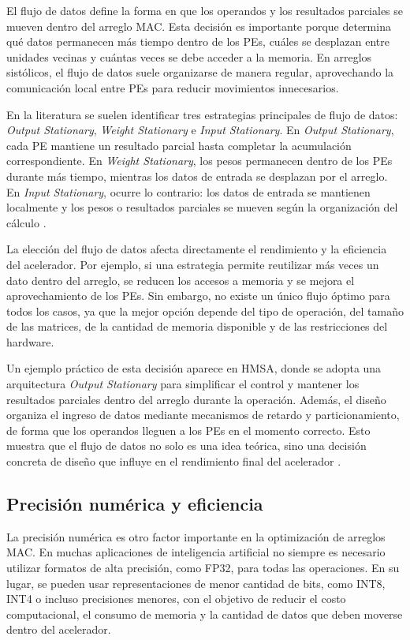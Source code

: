 \documentclass[conference]{IEEEtran}
\begin{document}
El flujo de datos define la forma en que los operandos y los resultados parciales se mueven dentro del arreglo MAC. Esta decisión es importante porque determina qué datos permanecen más tiempo dentro de los PEs, cuáles se desplazan entre unidades vecinas y cuántas veces se debe acceder a la memoria. En arreglos sistólicos, el flujo de datos suele organizarse de manera regular, aprovechando la comunicación local entre PEs para reducir movimientos innecesarios.

En la literatura se suelen identificar tres estrategias principales de flujo de datos: \textit{Output Stationary}, \textit{Weight Stationary} e \textit{Input Stationary}. En \textit{Output Stationary}, cada PE mantiene un resultado parcial hasta completar la acumulación correspondiente. En \textit{Weight Stationary}, los pesos permanecen dentro de los PEs durante más tiempo, mientras los datos de entrada se desplazan por el arreglo. En \textit{Input Stationary}, ocurre lo contrario: los datos de entrada se mantienen localmente y los pesos o resultados parciales se mueven según la organización del cálculo \cite{xu2023survey}.

La elección del flujo de datos afecta directamente el rendimiento y la eficiencia del acelerador. Por ejemplo, si una estrategia permite reutilizar más veces un dato dentro del arreglo, se reducen los accesos a memoria y se mejora el aprovechamiento de los PEs. Sin embargo, no existe un único flujo óptimo para todos los casos, ya que la mejor opción depende del tipo de operación, del tamaño de las matrices, de la cantidad de memoria disponible y de las restricciones del hardware.

Un ejemplo práctico de esta decisión aparece en HMSA, donde se adopta una arquitectura \textit{Output Stationary} para simplificar el control y mantener los resultados parciales dentro del arreglo durante la operación. Además, el diseño organiza el ingreso de datos mediante mecanismos de retardo y particionamiento, de forma que los operandos lleguen a los PEs en el momento correcto. Esto muestra que el flujo de datos no solo es una idea teórica, sino una decisión concreta de diseño que influye en el rendimiento final del acelerador \cite{cao2025hmsa}.

\subsection{Precisión numérica y eficiencia}

La precisión numérica es otro factor importante en la optimización de arreglos MAC. En muchas aplicaciones de inteligencia artificial no siempre es necesario utilizar formatos de alta precisión, como FP32, para todas las operaciones. En su lugar, se pueden usar representaciones de menor cantidad de bits, como INT8, INT4 o incluso precisiones menores, con el objetivo de reducir el costo computacional, el consumo de memoria y la cantidad de datos que deben moverse dentro del acelerador.
\end{document}
